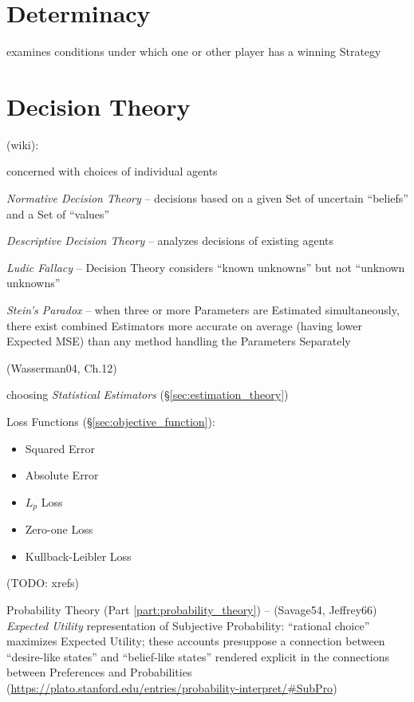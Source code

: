 \section{Determinacy}\label{sec:determinacy}

examines conditions under which one or other player has a winning Strategy



\section{Decision Theory}\label{sec:decision_theory}

(wiki):

concerned with choices of individual agents

\emph{Normative Decision Theory} -- decisions based on a given Set of uncertain
``beliefs'' and a Set of ``values''

\emph{Descriptive Decision Theory} -- analyzes decisions of existing agents

\emph{Ludic Fallacy} -- Decision Theory considers ``known unknowns'' but not
``unknown unknowns''

\emph{Stein's Paradox} -- when three or more Parameters are Estimated
simultaneously, there exist combined Estimators more accurate on average (having
lower Expected MSE) than any method handling the Parameters Separately

(Wasserman04, Ch.12)

choosing \emph{Statistical Estimators} (\S\ref{sec:estimation_theory})

Loss Functions (\S\ref{sec:objective_function}):
\begin{itemize}
  \item Squared Error
  \item Absolute Error
  \item $L_p$ Loss
  \item Zero-one Loss
  \item Kullback-Leibler Loss
\end{itemize}
(TODO: xrefs)

\fist Probability Theory (Part \ref{part:probability_theory}) -- (Savage54,
Jeffrey66) \emph{Expected Utility} representation of Subjective Probability:
``rational choice'' maximizes Expected Utility; these accounts presuppose a
connection between ``desire-like states'' and ``belief-like states'' rendered
explicit in the connections between Preferences and Probabilities
(\url{https://plato.stanford.edu/entries/probability-interpret/#SubPro})

